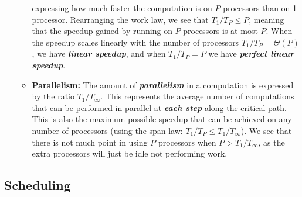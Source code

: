 \documentclass[bsc,frontabs,singlespacing,parskip,deptreport,normalheadings]{infthesis}
\begin{document}
\begin{itemize}
\begin{itemize}
            expressing how much faster the computation is on \(P\) processors
            than on 1 processor. Rearranging the work law, we see that \(T_1 /
            T_P \leq P\), meaning that the speedup gained by running on \(P\)
            processors is at most \(P\). When the speedup scales linearly
            with the number of processors \(T_1 / T_P = \Theta(P)\), we have
            \textit{\textbf{linear speedup}}, and when \(T_1 / T_P = P\) we have
            \textit{\textbf{perfect linear speedup}}.
        \item \textbf{Parallelism:} The amount of \textit{\textbf{parallelism}} in a
            computation is expressed by the ratio \(T_1 / T_\infty\). This
            represents the average number of computations that can be performed
            in parallel at \textit{\textbf{each step}} along the critical path. This is
            also the maximum possible speedup that can be achieved on any number
            of processors (using the span law: \(T_1 / T_P \leq T_1 /
            T_\infty\)). We see that there is not much point in using
            \(P\) processors when \(P > T_1 / T_\infty\), as the extra
            processors will just be idle not performing work.
    \end{itemize}
\end{itemize}

\subsection{Scheduling}
\end{document}

